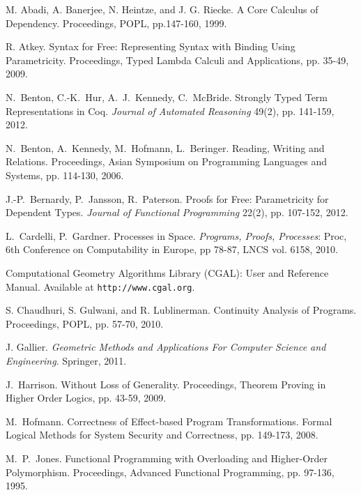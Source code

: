 \documentclass[preprint]{sigplanconf}
\theoremstyle{examplestyle}
\theoremstyle{restatementstyle}
\begin{document}

\begin{thebibliography}{12}
\softraggedright

M. Abadi, A. Banerjee, N. Heintze, and J. G. Riecke. A Core Calculus
of Dependency. Proceedings, POPL, pp.147-160, 1999.

R. Atkey.  Syntax for Free: Representing Syntax with Binding Using
Parametricity.  Proceedings, Typed Lambda Calculi and Applications,
pp. 35-49, 2009.

N.~Benton, C.-K.~Hur, A.~J.~Kennedy, C.~McBride.
Strongly Typed Term Representations in {Coq}.
{\em Journal of Automated Reasoning} 49(2), pp. 141-159, 2012.

N.~Benton, A.~Kennedy, M.~Hofmann, L.~Beringer.
Reading, Writing and Relations.
Proceedings, Asian Symposium on Programming Languages and Systems,
pp. 114-130, 2006.

J.-P.~Bernardy, P.~Jansson, R.~Paterson.
Proofs for Free: Parametricity for Dependent Types.
{\em Journal of Functional Programming} 22(2), pp. 107-152, 2012.

L.~Cardelli, P.~Gardner.
Processes in Space.
{\em Programs, Proofs, Processes}: Proc, 6th Conference on Computability in Europe, pp 78-87, LNCS vol. 6158, 2010.

Computational Geometry Algorithms Library (CGAL): User and Reference
Manual.  Available at {\tt http://www.cgal.org}.

S. Chaudhuri, S. Gulwani, and R. Lublinerman.  Continuity Analysis of
Programs.  Proceedings, POPL, pp. 57-70, 2010.

J. Gallier. {\em Geometric Methods and Applications For Computer
Science and Engineering}. Springer, 2011.

J.~Harrison.
Without Loss of Generality.
Proceedings, Theorem Proving in Higher Order Logics,
pp. 43-59, 2009.

M.~Hofmann. Correctness of Effect-based Program
Transformations. Formal Logical Methods for System Security and
Correctness, pp. 149-173, 2008.

M.~P.~Jones.  Functional Programming with Overloading and Higher-Order
Polymorphism. Proceedings, Advanced Functional Programming,
pp. 97-136, 1995.


\end{thebibliography}
\end{document}
